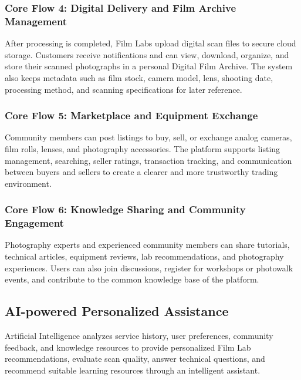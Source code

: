 \subsubsection{Core Flow 4: Digital Delivery and Film Archive Management}

After processing is completed, Film Labs upload digital scan files to secure
cloud storage. Customers receive notifications and can view, download,
organize, and store their scanned photographs in a personal Digital Film
Archive. The system also keeps metadata such as film stock, camera model,
lens, shooting date, processing method, and scanning specifications for later
reference.

\subsubsection{Core Flow 5: Marketplace and Equipment Exchange}

Community members can post listings to buy, sell, or exchange analog cameras,
film rolls, lenses, and photography accessories. The platform supports listing
management, searching, seller ratings, transaction tracking, and communication
between buyers and sellers to create a clearer and more trustworthy trading
environment.

\subsubsection{Core Flow 6: Knowledge Sharing and Community Engagement}

Photography experts and experienced community members can share tutorials,
technical articles, equipment reviews, lab recommendations, and photography
experiences. Users can also join discussions, register for workshops or
photowalk events, and contribute to the common knowledge base of the platform.

\subsection{AI-powered Personalized Assistance}

Artificial Intelligence analyzes service history, user preferences, community
feedback, and knowledge resources to provide personalized Film Lab
recommendations, evaluate scan quality, answer technical questions, and
recommend suitable learning resources through an intelligent assistant.
